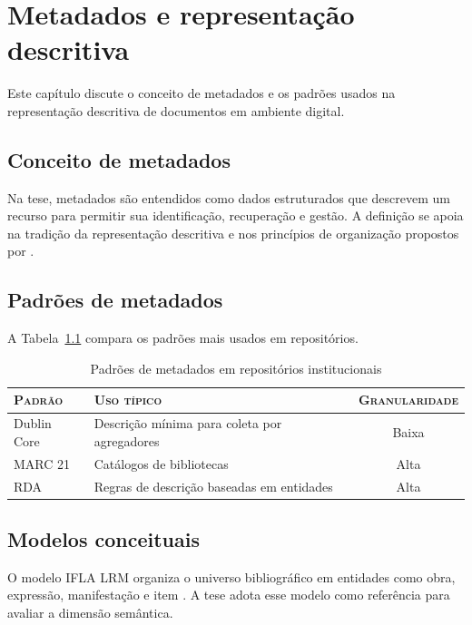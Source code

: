 \chapter{Metadados e representação descritiva}
\label{cap:metadados}


Este capítulo discute o conceito de metadados e os padrões usados na representação descritiva de documentos em ambiente digital.

\section{Conceito de metadados}

Na tese, metadados são entendidos como dados estruturados que descrevem um recurso para permitir sua identificação, recuperação e gestão. A definição se apoia na tradição da representação descritiva e nos princípios de organização propostos por .

\section{Padrões de metadados}

A Tabela~\ref{tab:padroes} compara os padrões mais usados em repositórios.

\begin{table}[htb]
  \centering
  \caption{Padrões de metadados em repositórios institucionais}
  \label{tab:padroes}
  \small
  \begin{tabularx}{\textwidth}{lXc}
    \toprule
    \textsc{Padrão} & \textsc{Uso típico} & \textsc{Granularidade} \\
    \midrule
    Dublin Core & Descrição mínima para coleta por agregadores & Baixa \\
    MARC 21 & Catálogos de bibliotecas & Alta \\
    RDA & Regras de descrição baseadas em entidades & Alta \\
    \bottomrule
  \end{tabularx}
\end{table}

\section{Modelos conceituais}
O modelo IFLA LRM organiza o universo bibliográfico em entidades como obra, expressão, manifestação e item \cite{riva2017}. A tese adota esse modelo como referência para avaliar a dimensão semântica.
